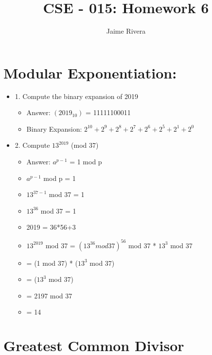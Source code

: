 \documentclass[11pt]{article}
\title{CSE - 015: Homework 6}
\author{Jaime Rivera}
\begin{document}
\maketitle


\section{Modular Exponentiation:}

\begin{itemize}

\item 1. Compute the binary expansion of 2019

\begin{itemize}

\item Answer: $(2019_{10})$ = 11111100011
\item Binary Expansion: $ 2^{10} + 2^{9} + 2^{8} + 2^{7}+2^{6}+ 2^{5}+ 2^{1}+ 2^{0}$

\end{itemize} 

\item 2. Compute $13^{2019}$ (mod 37) 

\begin{itemize}

\item Answer: $a^{p-1} $ = 1 mod p 
\item $a^{p-1} $ mod p = 1
\item $13^{37-1}$  mod 37 = 1
\item $13^{36}$  mod 37 = 1
\item 2019 = 36*56+3
\item $13^{2019}$  mod 37 = $(13^{36}  mod 37)^{56}$ mod 37 * $13^{3}$ mod 37
\item = (1 mod 37) * ($13^{3}$ mod 37)
\item = ($13^{3}$ mod 37)
\item = 2197 mod 37 
\item = 14 

\end{itemize} 

\end{itemize} 



\section{Greatest Common Divisor}
\end{document}
